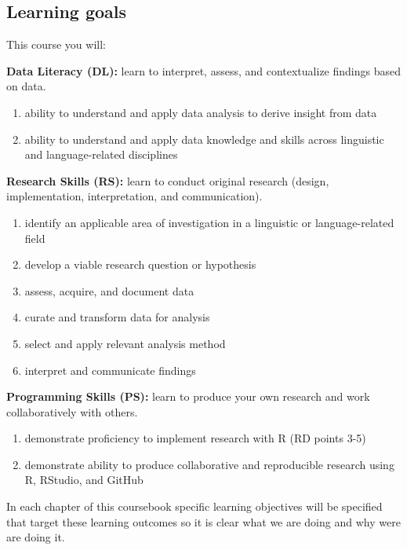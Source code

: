 \documentclass[
]{article}
\providecommand{\tightlist}{%
  \setlength{\itemsep}{0pt}\setlength{\parskip}{0pt}}
\begin{document}
\hypertarget{learning-goals}{%
\subsection{Learning goals}\label{learning-goals}}

This course you will:

\textbf{Data Literacy (DL):} learn to interpret, assess, and contextualize findings based on data.

\begin{enumerate}
\def\labelenumi{\arabic{enumi}.}
\tightlist
\item
  ability to understand and apply data analysis to derive insight from data
\item
  ability to understand and apply data knowledge and skills across linguistic and language-related disciplines
\end{enumerate}

\textbf{Research Skills (RS):} learn to conduct original research (design, implementation, interpretation, and communication).

\begin{enumerate}
\def\labelenumi{\arabic{enumi}.}
\tightlist
\item
  identify an applicable area of investigation in a linguistic or language-related field
\item
  develop a viable research question or hypothesis
\item
  assess, acquire, and document data
\item
  curate and transform data for analysis
\item
  select and apply relevant analysis method
\item
  interpret and communicate findings
\end{enumerate}

\textbf{Programming Skills (PS):} learn to produce your own research and work collaboratively with others.

\begin{enumerate}
\def\labelenumi{\arabic{enumi}.}
\tightlist
\item
  demonstrate proficiency to implement research with R (RD points 3-5)
\item
  demonstrate ability to produce collaborative and reproducible research using R, RStudio, and GitHub
\end{enumerate}

In each chapter of this coursebook specific learning objectives will be specified that target these learning outcomes so it is clear what we are doing and why were are doing it.
\end{document}

